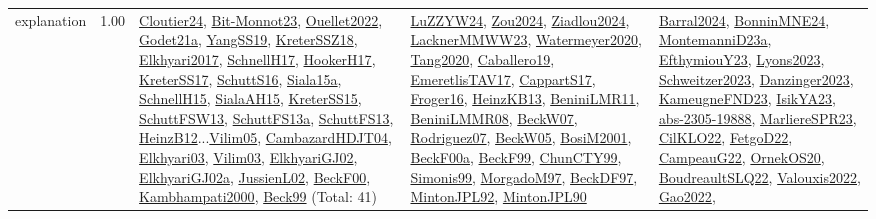 {\begin{longtable}{p{3cm}r>{\raggedright\arraybackslash}p{6cm}>{\raggedright\arraybackslash}p{6cm}>{\raggedright\arraybackslash}p{8cm}}
\index{explanation}\index{Concepts!explanation}explanation &  1.00 & \hyperref[detail:Cloutier24]{Cloutier24}, \hyperref[detail:Bit-Monnot23]{Bit-Monnot23}, \hyperref[detail:Ouellet2022]{Ouellet2022}, \hyperref[detail:Godet21a]{Godet21a}, \hyperref[detail:YangSS19]{YangSS19}, \hyperref[detail:KreterSSZ18]{KreterSSZ18}, \hyperref[detail:Elkhyari2017]{Elkhyari2017}, \hyperref[detail:SchnellH17]{SchnellH17}, \hyperref[detail:HookerH17]{HookerH17}, \hyperref[detail:KreterSS17]{KreterSS17}, \hyperref[detail:SchuttS16]{SchuttS16}, \hyperref[detail:Siala15a]{Siala15a}, \hyperref[detail:SchnellH15]{SchnellH15}, \hyperref[detail:SialaAH15]{SialaAH15}, \hyperref[detail:KreterSS15]{KreterSS15}, \hyperref[detail:SchuttFSW13]{SchuttFSW13}, \hyperref[detail:SchuttFS13a]{SchuttFS13a}, \hyperref[detail:SchuttFS13]{SchuttFS13}, \hyperref[detail:HeinzB12]{HeinzB12}...\hyperref[detail:Vilim05]{Vilim05}, \hyperref[detail:CambazardHDJT04]{CambazardHDJT04}, \hyperref[detail:Elkhyari03]{Elkhyari03}, \hyperref[detail:Vilim03]{Vilim03}, \hyperref[detail:ElkhyariGJ02]{ElkhyariGJ02}, \hyperref[detail:ElkhyariGJ02a]{ElkhyariGJ02a}, \hyperref[detail:JussienL02]{JussienL02}, \hyperref[detail:BeckF00]{BeckF00}, \hyperref[detail:Kambhampati2000]{Kambhampati2000}, \hyperref[detail:Beck99]{Beck99} (Total: 41) & \hyperref[detail:LuZZYW24]{LuZZYW24}, \hyperref[detail:Zou2024]{Zou2024}, \hyperref[detail:Ziadlou2024]{Ziadlou2024}, \hyperref[detail:LacknerMMWW23]{LacknerMMWW23}, \hyperref[detail:Watermeyer2020]{Watermeyer2020}, \hyperref[detail:Tang2020]{Tang2020}, \hyperref[detail:Caballero19]{Caballero19}, \hyperref[detail:EmeretlisTAV17]{EmeretlisTAV17}, \hyperref[detail:CappartS17]{CappartS17}, \hyperref[detail:Froger16]{Froger16}, \hyperref[detail:HeinzKB13]{HeinzKB13}, \hyperref[detail:BeniniLMR11]{BeniniLMR11}, \hyperref[detail:BeniniLMMR08]{BeniniLMMR08}, \hyperref[detail:BeckW07]{BeckW07}, \hyperref[detail:Rodriguez07]{Rodriguez07}, \hyperref[detail:BeckW05]{BeckW05}, \hyperref[detail:BosiM2001]{BosiM2001}, \hyperref[detail:BeckF00a]{BeckF00a}, \hyperref[detail:BeckF99]{BeckF99}, \hyperref[detail:ChunCTY99]{ChunCTY99}, \hyperref[detail:Simonis99]{Simonis99}, \hyperref[detail:MorgadoM97]{MorgadoM97}, \hyperref[detail:BeckDF97]{BeckDF97}, \hyperref[detail:MintonJPL92]{MintonJPL92}, \hyperref[detail:MintonJPL90]{MintonJPL90} & \hyperref[detail:Barral2024]{Barral2024}, \hyperref[detail:BonninMNE24]{BonninMNE24}, \hyperref[detail:MontemanniD23a]{MontemanniD23a}, \hyperref[detail:EfthymiouY23]{EfthymiouY23}, \hyperref[detail:Lyons2023]{Lyons2023}, \hyperref[detail:Schweitzer2023]{Schweitzer2023}, \hyperref[detail:Danzinger2023]{Danzinger2023}, \hyperref[detail:KameugneFND23]{KameugneFND23}, \hyperref[detail:IsikYA23]{IsikYA23}, \hyperref[detail:abs-2305-19888]{abs-2305-19888}, \hyperref[detail:MarliereSPR23]{MarliereSPR23}, \hyperref[detail:CilKLO22]{CilKLO22}, \hyperref[detail:FetgoD22]{FetgoD22}, \hyperref[detail:CampeauG22]{CampeauG22}, \hyperref[detail:OrnekOS20]{OrnekOS20}, \hyperref[detail:BoudreaultSLQ22]{BoudreaultSLQ22}, \hyperref[detail:Valouxis2022]{Valouxis2022}, \hyperref[detail:Gao2022]{Gao2022}, 
\end{longtable}}
